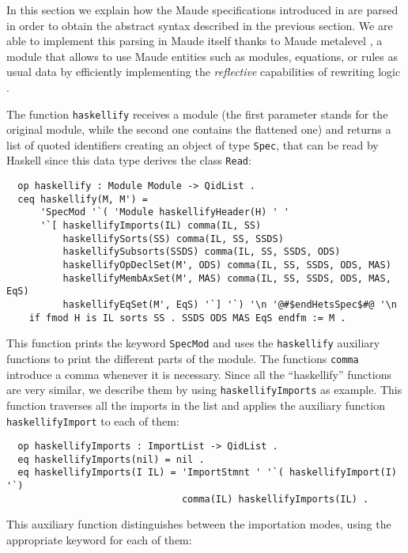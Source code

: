 
In this section we explain how the Maude specifications introduced in
\Hets are parsed in order to obtain the abstract syntax described in
the previous section. We are able to implement this parsing in Maude
itself thanks to Maude metalevel \cite[Chapter 14]{maude-book}, a
module that allows to use Maude entities such as modules, equations,
or rules as usual data by efficiently implementing the \emph{reflective}
capabilities of rewriting logic \cite{ClavelMeseguerPalomino07}.

The function \verb"haskellify" receives a module (the first parameter
stands for the original module, while the second one contains the
flattened one) and returns a list of quoted identifiers creating an
object of type \verb"Spec", that can be read by Haskell since this data
type derives the class \verb"Read":

{\codesize
\begin{verbatim}
  op haskellify : Module Module -> QidList .
  ceq haskellify(M, M') = 
      'SpecMod '`( 'Module haskellifyHeader(H) ' ' 
      '`[ haskellifyImports(IL) comma(IL, SS)
          haskellifySorts(SS) comma(IL, SS, SSDS)
          haskellifySubsorts(SSDS) comma(IL, SS, SSDS, ODS)
          haskellifyOpDeclSet(M', ODS) comma(IL, SS, SSDS, ODS, MAS)
          haskellifyMembAxSet(M', MAS) comma(IL, SS, SSDS, ODS, MAS, EqS)
          haskellifyEqSet(M', EqS) '`] '`) '\n '@#$endHetsSpec$#@ '\n
    if fmod H is IL sorts SS . SSDS ODS MAS EqS endfm := M .
\end{verbatim}
}

This function prints the keyword \verb"SpecMod" and uses the \verb"haskellify"
auxiliary functions to print the different parts of the module.
The functions \verb"comma" introduce a comma whenever it is necessary.
Since all the ``haskellify'' functions are very similar, we describe
them by using \verb"haskellifyImports" as example. This function traverses
all the imports in the list and applies the auxiliary function
\verb"haskellifyImport" to each of them:

{\codesize
\begin{verbatim}
  op haskellifyImports : ImportList -> QidList .
  eq haskellifyImports(nil) = nil .
  eq haskellifyImports(I IL) = 'ImportStmnt ' '`( haskellifyImport(I) '`)
                               comma(IL) haskellifyImports(IL) .
\end{verbatim}
}

This auxiliary function distinguishes between the importation modes,
using the appropriate keyword for each of them:

